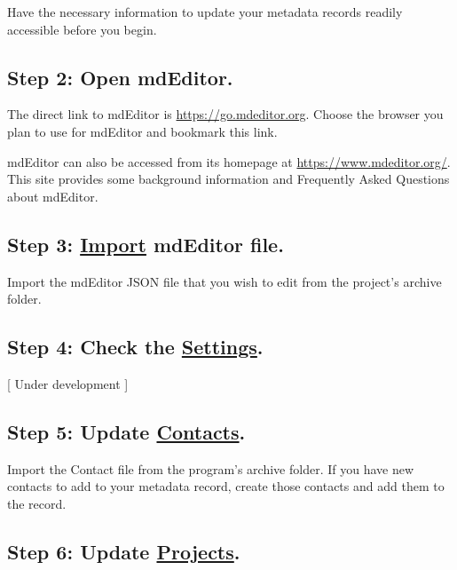 \documentclass[
]{book}
\begin{document}
Have the necessary information to update your metadata records readily accessible before you begin.

\hypertarget{step-2-open-mdeditor.-1}{%
\subsection{Step 2: Open mdEditor.}\label{step-2-open-mdeditor.-1}}

The direct link to mdEditor is \url{https://go.mdeditor.org}. Choose the browser you plan to use for mdEditor and bookmark this link.

mdEditor can also be accessed from its homepage at \url{https://www.mdeditor.org/}. This site provides some background information and Frequently Asked Questions about mdEditor.

\hypertarget{step-3-import-mdeditor-file.}{%
\subsection{\texorpdfstring{Step 3: \protect\hyperlink{import}{Import} mdEditor file.}{Step 3: Import mdEditor file.}}\label{step-3-import-mdeditor-file.}}

Import the mdEditor JSON file that you wish to edit from the project's archive folder.

\hypertarget{step-4-check-the-settings.}{%
\subsection{\texorpdfstring{Step 4: Check the \protect\hyperlink{settings}{Settings}.}{Step 4: Check the Settings.}}\label{step-4-check-the-settings.}}

{[} Under development {]}

\hypertarget{step-5-update-contacts.}{%
\subsection{\texorpdfstring{Step 5: Update \protect\hyperlink{contact-entry-guidance}{Contacts}.}{Step 5: Update Contacts.}}\label{step-5-update-contacts.}}

Import the Contact file from the program's archive folder. If you have new contacts to add to your metadata record, create those contacts and add them to the record.

\hypertarget{step-6-update-projects.}{%
\subsection{\texorpdfstring{Step 6: Update \protect\hyperlink{project-entry-guidance}{Projects}.}{Step 6: Update Projects.}}\label{step-6-update-projects.}}
\end{document}
